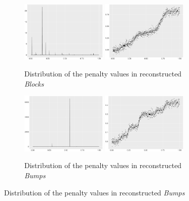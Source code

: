 \begin{figure}
    \centering
    \begin{subfigure}{\textwidth}
    \centering
    \includegraphics[width=0.45\textwidth]{Chapters/02TractorSplineTheory/plot/ggplot/ggBlocksPenaltyBar.pdf}
    \includegraphics[width=0.45\textwidth]{Chapters/02TractorSplineTheory/plot/ggplot/ggBlocksPenaltyLine.pdf}
    \caption{Distribution of the penalty values in reconstructed \textit{Blocks}}
    \end{subfigure}
    \begin{subfigure}{\textwidth}
    \centering
    \includegraphics[width=0.45\textwidth]{Chapters/02TractorSplineTheory/plot/ggplot/ggBumpsPenaltyBar.pdf}
    \includegraphics[width=0.45\textwidth]{Chapters/02TractorSplineTheory/plot/ggplot/ggBumpsPenaltyLine.pdf}
    \caption{Distribution of the penalty values in reconstructed \textit{Bumps}}

\end{subfigure}
\end{figure}
